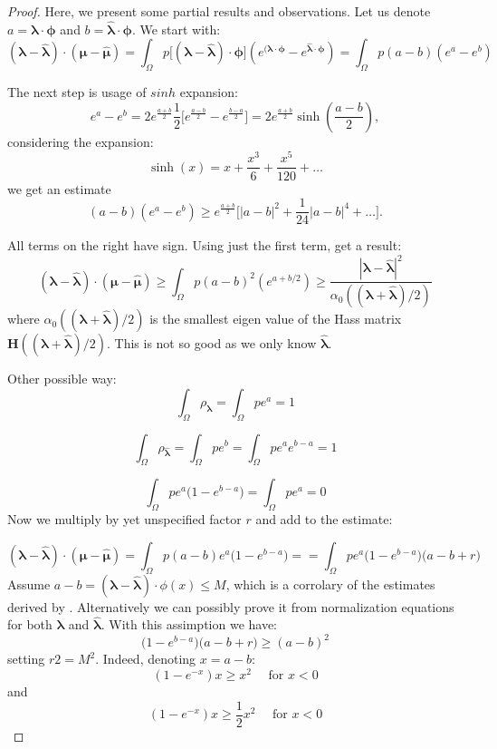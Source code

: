 \documentclass{article}
\def\vc#1{\mathbf{\boldsymbol{#1}}}     %
\def\tn#1{\boldsymbol{#1}}
\def\vl{{\vc\lambda}}
\def\estvl{{\vc{\hat\lambda}}}
\def\vmu{\vc\mu}
\def\estvmu{{\vc{\hat\mu}}}
\def\vphi{\vc\phi}
\begin{document}
\begin{proof}

Here, we present some partial results and observations.
Let us denote $a=\vl\cdot\vphi$ and $b = \estvl\cdot\vphi$. We start with:
\[
  (\vl - \estvl)\cdot(\vmu - \estvmu)
      = \int_{\Omega} p \big[(\vl - \estvl)\cdot\vphi\big] (e^{(\vl\cdot\vphi} - e^{\estvl\cdot\vphi})
      =\int_{\Omega} p (a - b)(e^a - e^b)
\]

The next step is usage of $sinh$ expansion:
\[
 e^a - e^b = 2 e^{\frac{a+b}{2}}\frac{1}{2}\Big[e^{\frac{a-b}{2}} - e^{\frac{b-a}{2}}\Big] = 
 2 e^{\frac{a+b}{2}}\sinh(\frac{a-b}{2}),
\]
considering the expansion:
\[
    \sinh(x) = x + \frac{x^3}{6} + \frac{x^5}{120} + \dots
\]
we get an estimate
 \[
  (a-b)(e^a - e^b) \ge e^{\frac{a+b}{2}}\Big[|a-b|^2 + \frac{1}{24}|a-b|^4 + \dots\Big].
 \]

 All terms on the right have sign. Using just the first term, get a result:
\[
  (\vl - \estvl)\cdot(\vmu - \estvmu) \ge \int_{\Omega} p (a - b)^2(e^{a+b/2})
   \ge \frac{|\vl - \estvl|^2}{\alpha_0((\vl + \estvl)/2)}
\]
where $\alpha_0((\vl + \estvl)/2)$ is the smallest eigen value of the Hass matrix
$\tn H((\vl + \estvl)/2)$. This is not so good as we only know $\estvl$. 

 
  
Other possible way:
\[
   \int_\Omega \rho_{\vl} = \int_{\Omega} p e^a = 1
\]

\[
 \int_\Omega \rho_{\estvl} = \int_{\Omega} p e^b  = \int_{\Omega} p e^a e^{b-a}  = 1
\]

\[
   \int_\Omega p e^a \Big(1 - e^{b-a}\Big) = \int_{\Omega} p e^a = 0
\]
Now we multiply by yet unspecified factor $r$ and add to the estimate:

\[
  (\vl - \estvl)\cdot(\vmu - \estvmu) 
      = \int_{\Omega} p (a - b) e^a\Big(1 - e^{b-a}\Big) =
      = \int_{\Omega} p e^a\Big(1 - e^{b-a}\Big)\Big(a - b + r\Big)
\]
Assume $a-b = (\vl-\estvl) \cdot \phi(x) \le M$, which is a corrolary of the estimates
derived by \cite{Barron1991}. Alternatively we can possibly prove it from normalization equations for both $\vl$ and $\estvl$. With this assimption we have:
\[
 \Big(1 - e^{b-a}\Big)\Big(a - b + r\Big) \ge (a-b)^2
\]
setting $r 2= M^2$. Indeed, denoting $x=a-b$:
\[
  (1 - e^{-x})x \ge x^2\quad\text{ for } x<0
\]
and 
\[
  (1 - e^{-x})x \ge \frac12 x^2\quad\text{ for } x<0
\]


\end{proof}
\end{document}
